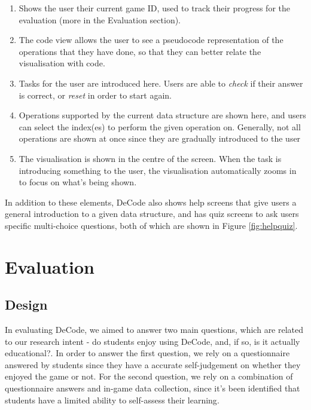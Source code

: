 \documentclass[10pt]{article}
\begin{document}
\begin{enumerate}
  \item Shows the user their current game ID, used to track their progress for the evaluation (more in the Evaluation section).
  \item The code view allows the user to see a pseudocode representation of the operations that they have done, so that they can better relate the visualisation with code.
  \item Tasks for the user are introduced here. Users are able to \emph{check} if their answer is correct, or \emph{reset} in order to start again.
  \item Operations supported by the current data structure are shown here, and users can select the index(es) to perform the given operation on. Generally, not all operations are shown at once since they are gradually introduced to the user
  \item The visualisation is shown in the centre of the screen. When the task is introducing something to the user, the visualisation automatically zooms in to focus on what's being shown.
\end{enumerate}
In addition to these elements, DeCode also shows help screens that give users a general introduction to a given data structure, and has quiz screens to ask users specific multi-choice questions, both of which are shown in Figure \ref{fig:helpquiz}.
\section{Evaluation}
\subsection{Design}
In evaluating DeCode, we aimed to answer two main questions, which are related to our research intent - do students enjoy using DeCode, and, if so, is it actually educational?. In order to answer the first question, we rely on a questionnaire answered by students since they have a accurate self-judgement on whether they enjoyed the game or not. For the second question, we rely on a combination of questionnaire answers and in-game data collection, since it's been identified that students have a limited ability to self-assess their learning\cite{Battistella}.
\end{document}
